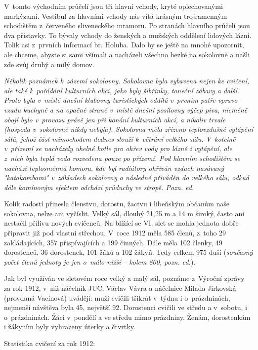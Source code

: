 \documentclass[a5paper, 11pt, twoside]{article}
\begin{document}
V~tomto východním průčelí jsou tři hlavní vchody, kryté oplechovanými
markýzami. Vestibul za hlavními vchody nás vítá krásným trojramenným
schodištěm z~červeného sliveneckého mramoru. Po stranách hlavního
průčelí jsou dva přístavky. To bývaly vchody do ženských a mužských
oddělení lidových lázní. Tolik asi z~prvních informací br. Holuba. Dalo
by se ještě na mnohé upozornit, ale chceme, abyste si sami všímali a
nacházeli všechno hezké na sokolovně a našli zde svůj druhý a milý
domov.

\textit{Několik poznámek k~zázemí sokolovny. Sokolovna byla vybavena nejen
ke cvičení, ale také k~pořádání kulturních akcí, jako byly šibřinky,
taneční zábavy a další. Proto byla v~místě dnešní klubovny turistických
oddílů v~prvním patře vpravo vzadu kuchyně a na opačné straně v~místě
dnešní posilovny výčep piva, nicméně obojí bylo v~provozu právě jen při
konání kulturních akcí, a nikoliv trvale (hospoda v~sokolovně nikdy
nebyla). Sokolovna měla zřízeno teplovzdušné vytápění sálů, jehož část
mimochodem dodnes slouží k~větrání velkého sálu. V~kotelně v~přízemí se
nacházely uhelné kotle pro ohřev vody pro lázně i vytápění, ale z~nich
byla teplá voda rozvedena pouze po přízemí. Pod hlavním schodištěm se
nachází teplosměnná komora, kde byl radiátory ohříván vzduch nasávaný
"katakombami" v~základech sokolovny a následně přiváděn do velkého
sálu, odkud dále komínovým efektem odchází průduchy ve stropě. Pozn.
ed.}

Kolik radostí přinesla členstvu, dorostu, žactvu i libeňským občanům
naše sokolovna, nelze ani vyčíslit. Velký sál, dlouhý 21,25 m a 14 m
široký, často ani nestačil přílivu nových cvičenců. Na blížící se VI.
slet se mohla jednota dobře připravit již pod vlastní střechou. V~roce
1912 měla 585 členů, z~toho 29 zakládajících, 357 přispívajících a 199
činných. Dále měla 102 členky, 49 dorostenců, 36 dorostenek, 101 žáků a
102 žákyň. Tedy celkem 975 duší (\textit{současný počet členů jednoty je
jen o~málo nižší -- kolem 800, pozn. ed.}).

Jak byl využíván ve sletovém roce velký a malý sál, poznáme z~Výroční
zprávy za rok 1912, v~níž náčelník JUC. Václav Vávra a náčelnice Milada
Jirkovská (provdaná Vacínová) uvádějí: muži cvičili třikrát v~týdnu i
o~prázdninách, nejmenší návštěva byla 45, největší 92. Dorostenci cvičili
ve středu a v~sobotu, i o~prázdninách. Žáci v~pondělí a ve středu mimo
prázdniny. Ženám, dorostenkám i žákyním byly vyhrazeny úterky a čtvrtky.

Statistika cvičení za rok 1912:
\end{document}
